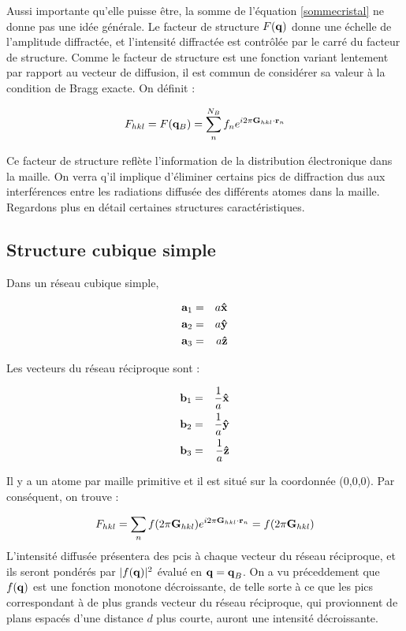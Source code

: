 Aussi importante qu'elle puisse être, la somme de l'équation \ref{sommecristal}
ne donne pas une idée générale. Le facteur de structure $F(\mathbf{q})$ donne une
échelle de l'amplitude diffractée, et l'intensité diffractée est contrôlée
par le carré du facteur de structure. Comme le facteur de structure est une
fonction variant lentement par rapport au vecteur de diffusion, il est commun de
considérer sa valeur à la condition de Bragg exacte. On définit :

\begin{equation}
    F_{hkl} = F(\mathbf{q}_B) = \sum_n^{N_B} f_n e^{i2\pi \mathbf{G}_{hkl}\cdot\mathbf{r}_n}
\end{equation}

Ce facteur de structure reflète l'information de la distribution électronique
dans la maille. On verra q'il implique d'éliminer certains pics de diffraction
dus aux interférences entre les radiations diffusée des différents atomes dans
la maille.
Regardons plus en détail certaines structures caractéristiques.

\subsection{Structure cubique simple}

Dans un réseau cubique simple,

\begin{eqnarray}
    \mathbf{a}_1 & = & a \mathbf{\hat{x}} \\
    \mathbf{a}_2 & = & a \mathbf{\hat{y}} \\
    \mathbf{a}_3 & = & a \mathbf{\hat{z}}
\end{eqnarray}

Les vecteurs du réseau réciproque sont :

\begin{eqnarray}
    \mathbf{b}_1 & = & \frac{1}{a} \mathbf{\hat{x}} \\
    \mathbf{b}_2 & = & \frac{1}{a} \mathbf{\hat{y}} \\
    \mathbf{b}_3 & = & \frac{1}{a} \mathbf{\hat{z}}
\end{eqnarray}

Il y a un atome par maille primitive et il est situé sur la coordonnée (0,0,0).
Par conséquent, on trouve :

\begin{equation}
    F_{hkl} = \sum_n f(2\pi \mathbf{G}_{hkl}) e^{i 2\pi \mathbf{G}_{hkl}\cdot\mathbf{r}_n } = f(2\pi\mathbf{G}_{hkl})
\end{equation}
L'intensité diffusée présentera des pcis à chaque vecteur du réseau réciproque,
et ils seront pondérés par $|f(\mathbf{q})|^2$ évalué en $\mathbf{q = q}_B$. On a
vu préceddement que $f(\mathbf{q})$ est une fonction monotone décroissante,
de telle sorte à ce que les pics correspondant à de plus grands vecteur du
réseau réciproque, qui provionnent de plans espacés d'une distance $d$ plus
courte, auront une intensité décroissante.
